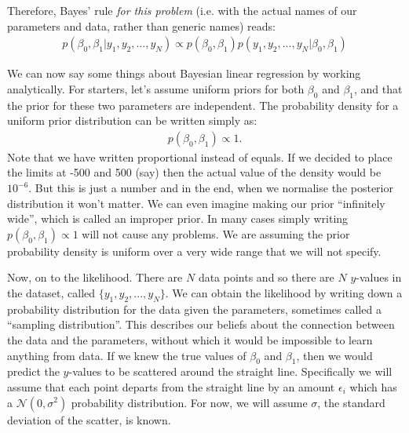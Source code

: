 Therefore, Bayes' rule {\it for this problem} (i.e. with the actual names
of our parameters and data, rather than generic names) reads:
\begin{eqnarray}
p(\beta_0, \beta_1 | y_1, y_2, ..., y_N) \propto
p(\beta_0, \beta_1)p(y_1, y_2, ..., y_N | \beta_0, \beta_1)
\end{eqnarray}

We can now say some things about Bayesian linear regression by working
analytically. For starters, 
let's assume uniform priors for both $\beta_0$ and $\beta_1$, and that the
prior for these two parameters are independent. The probability density for
a uniform prior distribution can be written simply as:
\begin{eqnarray}
p(\beta_0, \beta_1) \propto 1.
\end{eqnarray}
Note that we have written proportional instead of equals. If we decided to
place the limits at -500 and 500 (say) then the actual value of the density
would be $10^{-6}$. But this is just a number and in the end, when we normalise
the posterior distribution it won't matter. We can even imagine making our
prior ``infinitely wide'', which is called an improper prior. In many cases
simply writing $p(\beta_0, \beta_1) \propto 1$ will not cause any problems. We
are assuming the prior probability density is uniform over a very wide range
that we will not specify.

Now, on to the likelihood. There are $N$ data points and so there are $N$
$y$-values in the dataset, called $\{y_1, y_2, ..., y_N\}$. We can obtain the
likelihood by writing down a probability distribution for the data given the
parameters, sometimes called a ``sampling distribution''. This describes our
beliefs about the connection between the data and the parameters, without which
it would be impossible to learn anything from data.
If we
knew the true values of $\beta_0$ and $\beta_1$, then we would predict the
$y$-values to be scattered around the straight line. Specifically we
will assume that each point departs from the straight line by an amount
$\epsilon_i$ which has a $\mathcal{N}(0, \sigma^2)$ probability distribution.
For now, we will assume $\sigma$, the standard deviation of the scatter, is known.

